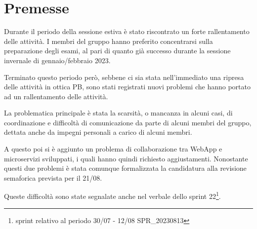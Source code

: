 \section{Premesse}

Durante il periodo della sessione estiva è stato riscontrato un forte rallentamento delle attività. I membri del gruppo hanno preferito concentrarsi sulla preparazione degli esami, al pari di quanto già successo durante la sessione invernale di gennaio/febbraio 2023.

Terminato questo periodo però, sebbene ci sia stata nell'immediato una ripresa delle attività in ottica PB, sono stati registrati nuovi problemi che hanno portato ad un rallentamento delle attività.

La problematica principale è stata la scarsità, o mancanza in alcuni casi, di coordinazione e difficoltà di comunicazione da parte di alcuni membri del gruppo, dettata anche da impegni personali a carico di alcuni membri.

A questo poi si è aggiunto un problema di collaborazione tra WebApp e microservizi sviluppati, i quali hanno quindi richiesto aggiustamenti. Nonostante questi due problemi è stata comunque formalizzata la candidatura alla revisione semaforica prevista per il 21/08.

Queste difficoltà sono state segnalate anche nel verbale dello sprint 22\footnote{sprint relativo al periodo 30/07 - 12/08 SPR\_20230813}.
